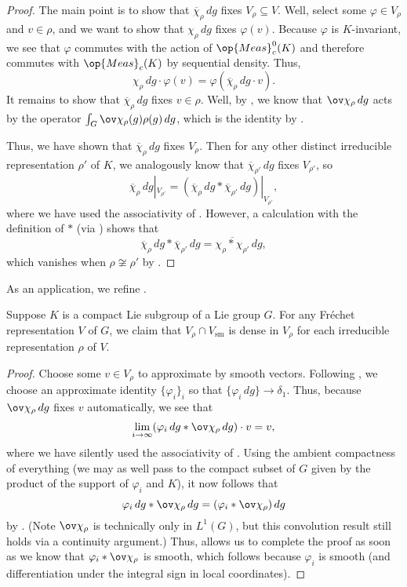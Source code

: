 \documentclass[../notes.tex]{subfiles}
\begin{document}
\begin{proof}
	The main point is to show that $\overline\chi_\rho\,dg$ fixes $V_\rho\subseteq V$. Well, select some $\varphi\in V_\rho$ and $v\in\rho$, and we want to show that $\chi_\rho\,dg$ fixes $\varphi(v)$. Because $\varphi$ is $K$-invariant, we see that $\varphi$ commutes with the action of $\op{Meas}_c^0(K)$ and therefore commutes with $\op{Meas}_c(K)$ by sequential density. Thus,
	\[\chi_\rho\,dg\cdot\varphi(v)=\varphi(\overline\chi_\rho\,dg\cdot v).\]
	It remains to show that $\overline\chi_\rho\,dg$ fixes $v\in\rho$. Well, by , we know that $\ov\chi_\rho\,dg$ acts by the operator $\int_G\ov\chi_\rho(g)\rho(g)\,dg$, which is the identity by .

	Thus, we have shown that $\overline\chi_\rho\,dg$ fixes $V_\rho$. Then for any other distinct irreducible representation $\rho'$ of $K$, we analogously know that $\overline\chi_{\rho'}\,dg$ fixes $V_{\rho'}$, so
	\[\overline\chi_\rho\,dg|_{V_{\rho'}}=(\overline\chi_\rho\,dg*\overline\chi_{\rho'}\,dg)|_{V_{\rho'}},\]
	where we have used the associativity of . However, a calculation with the definition of $*$ (via ) shows that
	\[\overline\chi_\rho\,dg*\overline\chi_{\rho'}\,dg=\overline{\chi_\rho*\chi_{\rho'}}\,dg,\]
	which vanishes when $\rho\not\cong\rho'$ by .
\end{proof}
As an application, we refine .
\begin{proposition} \label{prop:isotypic-smooth-dense}
	Suppose $K$ is a compact Lie subgroup of a Lie group $G$. For any Fr\'echet representation $V$ of $G$, we claim that $V_\rho\cap V_{\mathrm{sm}}$ is dense in $V_{\rho}$ for each irreducible representation $\rho$ of $V$.
\end{proposition}
\begin{proof}
	Choose some $v\in V_\rho$ to approximate by smooth vectors. Following , we choose an approximate identity $\{\varphi_i\}_i$ so that $\{\varphi_i\,dg\}\to\delta_1$. Thus, because $\ov\chi_\rho\,dg$ fixes $v$ automatically, we see that
	\[\lim_{i\to\infty}(\varphi_i\,dg*\ov\chi_\rho\,dg)\cdot v=v,\]
	where we have silently used the associativity of . Using the ambient compactness of everything (we may as well pass to the compact subset of $G$ given by the product of the support of $\varphi_i$ and $K$), it now follows that
	\[\varphi_i\,dg*\ov\chi_\rho\,dg=(\varphi_i*\ov\chi_\rho)\,dg\]
	by . (Note $\ov\chi_\rho$ is technically only in $L^1(G)$, but this convolution result still holds via a continuity argument.) Thus,  allows us to complete the proof as soon as we know that $\varphi_i*\ov\chi_\rho$ is smooth, which follows because $\varphi_i$ is smooth (and differentiation under the integral sign in local coordinates).
\end{proof}
\end{document}
